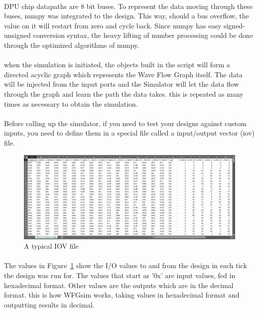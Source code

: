 \paragraph{}
DPU chip datapaths are 8 bit buses. To represent the data moving through these buses, numpy was integrated to the design. This way, should a bus overflow, the value on it will restart from zero and cycle back. Since numpy has easy signed-unsigned conversion syntax, the heavy lifting of number processing could be done through the optimized algorithms of numpy. 

\paragraph{}
when the simulation is initiated, the objects built in the script will form a directed acyclic graph which represents the Wave Flow Graph itself. The data will be injected from the input ports and the Simulator will let the data flow through the graph and learn the path the data takes. this is repeated as many times as necessary to obtain the simulation. 

\paragraph{}
Before calling up the simulator, if you need to test your designs against custom inputs, you need to define them in a special file called a input/output vector (iov) file.

\begin{figure}[H]
    \centering
    \includegraphics[trim=0cm 0cm 0cm 0cm, clip=true,scale=0.4]{figures/iov.jpg}
    \caption{A typical IOV file\label{Fig:iov}}\vspace{-4mm}
    \end{figure}

\paragraph{}
The values in Figure~\ref{Fig:iov} show the I/O values to and from the design in each tick the design was run for. The values that start as '0x' are input values, fed in hexadecimal format. Other values are the outputs which are in the decimal format. this is how WFGsim works, taking values in hexadecimal format and outputting results in decimal. 

